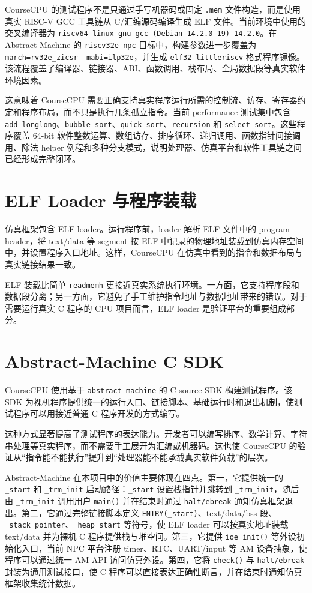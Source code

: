 \documentclass[UTF8,a4paper,12pt]{ctexrep}
\begin{document}
CourseCPU 的测试程序不是只通过手写机器码或固定 \texttt{.mem} 文件构造，而是使用真实 RISC-V GCC 工具链从 C/汇编源码编译生成 ELF 文件。当前环境中使用的交叉编译器为 \texttt{riscv64-linux-gnu-gcc (Debian 14.2.0-19) 14.2.0}。在 Abstract-Machine 的 \texttt{riscv32e-npc} 目标中，构建参数进一步覆盖为 \texttt{-march=rv32e\_zicsr -mabi=ilp32e}，并生成 \texttt{elf32-littleriscv} 格式程序镜像。该流程覆盖了编译器、链接器、ABI、函数调用、栈布局、全局数据段等真实软件环境因素。

这意味着 CourseCPU 需要正确支持真实程序运行所需的控制流、访存、寄存器约定和程序布局，而不只是执行几条孤立指令。当前 performance 测试集中包含 \texttt{add-longlong}、\texttt{bubble-sort}、\texttt{quick-sort}、\texttt{recursion} 和 \texttt{select-sort}。这些程序覆盖 64-bit 软件整数运算、数组访存、排序循环、递归调用、函数指针间接调用、除法 helper 例程和多种分支模式，说明处理器、仿真平台和软件工具链之间已经形成完整闭环。

\section{ELF Loader 与程序装载}

仿真框架包含 ELF loader。运行程序前，loader 解析 ELF 文件中的 program header，将 text/data 等 segment 按 ELF 中记录的物理地址装载到仿真内存空间中，并设置程序入口地址。这样，CourseCPU 在仿真中看到的指令和数据布局与真实链接结果一致。

ELF 装载比简单 \texttt{readmemh} 更接近真实系统执行环境。一方面，它支持程序段和数据段分离；另一方面，它避免了手工维护指令地址与数据地址带来的错误。对于需要运行真实 C 程序的 CPU 项目而言，ELF loader 是验证平台的重要组成部分。

\section{Abstract-Machine C SDK}

CourseCPU 使用基于 \texttt{abstract-machine} 的 C source SDK 构建测试程序。该 SDK 为裸机程序提供统一的运行入口、链接脚本、基础运行时和退出机制，使测试程序可以用接近普通 C 程序开发的方式编写。

这种方式显著提高了测试程序的表达能力。开发者可以编写排序、数学计算、字符串处理等真实程序，而不需要手工展开为汇编或机器码。这也使 CourseCPU 的验证从“指令能不能执行”提升到“处理器能不能承载真实软件负载”的层次。

Abstract-Machine 在本项目中的价值主要体现在四点。第一，它提供统一的 \texttt{\_start} 和 \texttt{\_trm\_init} 启动路径：\texttt{\_start} 设置栈指针并跳转到 \texttt{\_trm\_init}，随后由 \texttt{\_trm\_init} 调用用户 \texttt{main()} 并在结束时通过 \texttt{halt/ebreak} 通知仿真框架退出。第二，它通过完整链接脚本定义 \texttt{ENTRY(\_start)}、text/data/bss 段、\texttt{\_stack\_pointer}、\texttt{\_heap\_start} 等符号，使 ELF loader 可以按真实地址装载 text/data 并为裸机 C 程序提供栈与堆空间。第三，它提供 \texttt{ioe\_init()} 等外设初始化入口，当前 NPC 平台注册 timer、RTC、UART/input 等 AM 设备抽象，使程序可以通过统一 AM API 访问仿真外设。第四，它将 \texttt{check()} 与 \texttt{halt/ebreak} 封装为通用测试接口，使 C 程序可以直接表达正确性断言，并在结束时通知仿真框架收集统计数据。
\end{document}
